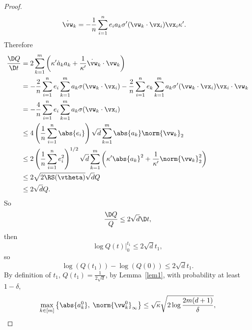 \documentclass{article}
\begin{document}
\begin{proof}
\begin{equation}
\begin{aligned}
            \dot{\vw}_k & = -\frac{1}{n}\sum_{i=1}^n e_i a_k\sigma'(\vw_k\cdot\vx_i)\vx_i\kappa'.
        \end{aligned}
    \end{equation}
    Therefore
    \begin{equation}
        \begin{aligned}
            \frac{\D Q}{\D t}
             & = 2\sum_{k=1}^m\left(\kappa'\dot{a}_k a_k + \frac{1}{\kappa'}\dot{\vw}_k\cdot\vw_k\right)                                                                    \\
             & = -\frac{2}{n}\sum_{i=1}^n e_i \sum_{k=1}^m a_k \sigma(\vw_k\cdot\vx_i) - \frac{2}{n}\sum_{i=1}^n e_k\sum_{k=1}^m a_k\sigma'(\vw_k\cdot\vx_i)\vx_i\cdot\vw_k \\
             & = -\frac{4}{n}\sum_{i=1}^n e_i\sum_{k=1}^m a_k\sigma(\vw_k\cdot\vx_i)                                                                                        \\
             & \leq 4\left(\frac{1}{n}\sum_{i=1}^n\abs{e_i}\right)\sqrt{d}\sum_{k=1}^m\abs{a_k}\norm{\vw_k}_2                                                               \\
             & \leq 2\left(\frac{1}{n}\sum_{i=1}^n e_i^2\right)^{1/2}\sqrt{d}\sum_{k=1}^m\left(\kappa'\abs{a_k}^2+\frac{1}{\kappa'}\norm{\vw_k}_2^2\right)                  \\
             & \leq 2\sqrt{2\RS(\vtheta)}\sqrt{d}Q                                                                                                                          \\
             & \leq 2\sqrt{d}Q.
        \end{aligned}
    \end{equation}
    So
    \begin{equation}
        \frac{\D Q}{Q} \leq 2\sqrt{d} \D t,
    \end{equation}
    then
    \begin{equation}
        \log Q(t)\Big|^{t_1}_0\leq 2\sqrt{d}t_1,
    \end{equation}
    so
    \begin{equation}
        \log(Q(t_1)) - \log(Q(0)) \leq 2\sqrt{d}t_1.
    \end{equation}
    By definition of $t_1$, $Q(t_1)=\frac{1}{2\sqrt{d}}$, by Lemma~\ref{lem1}, with probability at least $1-\delta$,
    \begin{equation}
        \max\limits_{k\in[m]}\left\{\abs{a_k^0},\;\norm{\vw_k^0}_{\infty}\right \}\leq\sqrt{\kappa}\sqrt{2\log\frac{2m(d+1)}{\delta}},

\end{equation}
\end{proof}
\end{document}
